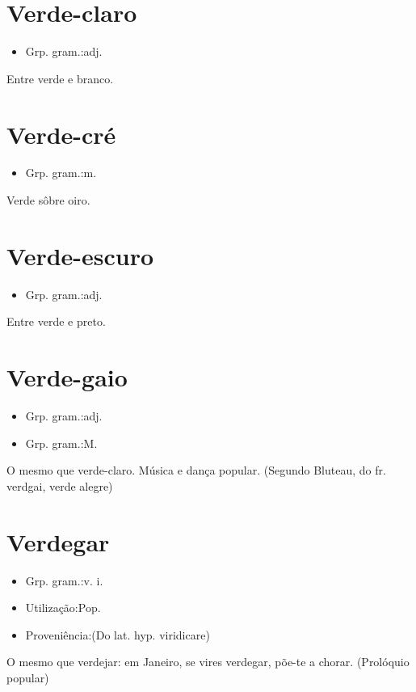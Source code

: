 \documentclass{article}
\begin{document}
\section{Verde-claro}
\begin{itemize}
\item {Grp. gram.:adj.}
\end{itemize}
Entre verde e branco.
\section{Verde-cré}
\begin{itemize}
\item {Grp. gram.:m.}
\end{itemize}
Verde sôbre oiro.
\section{Verde-escuro}
\begin{itemize}
\item {Grp. gram.:adj.}
\end{itemize}
Entre verde e preto.
\section{Verde-gaio}
\begin{itemize}
\item {Grp. gram.:adj.}
\end{itemize}
\begin{itemize}
\item {Grp. gram.:M.}
\end{itemize}
O mesmo que \textunderscore verde-claro\textunderscore .
Música e dança popular.
(Segundo Bluteau, do fr. \textunderscore verdgai\textunderscore , verde alegre)
\section{Verdegar}
\begin{itemize}
\item {Grp. gram.:v. i.}
\end{itemize}
\begin{itemize}
\item {Utilização:Pop.}
\end{itemize}
\begin{itemize}
\item {Proveniência:(Do lat. hyp. \textunderscore viridicare\textunderscore )}
\end{itemize}
O mesmo que \textunderscore verdejar\textunderscore : \textunderscore em Janeiro, se vires verdegar, põe-te a chorar\textunderscore . (Prolóquio popular)
\end{document}
